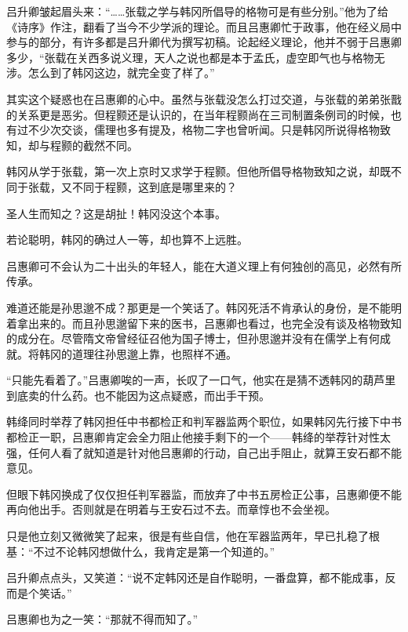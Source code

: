 吕升卿皱起眉头来：“……张载之学与韩冈所倡导的格物可是有些分别。”他为了给《诗序》作注，翻看了当今不少学派的理论。而且吕惠卿忙于政事，他在经义局中参与的部分，有许多都是吕升卿代为撰写初稿。论起经义理论，他并不弱于吕惠卿多少，“张载在关西多说义理，天人之说也都是本于孟氏，虚空即气也与格物无涉。怎么到了韩冈这边，就完全变了样了。”

其实这个疑惑也在吕惠卿的心中。虽然与张载没怎么打过交道，与张载的弟弟张戬的关系更是恶劣。但程颢还是认识的，在当年程颢尚在三司制置条例司的时候，也有过不少次交谈，儒理也多有提及，格物二字也曾听闻。只是韩冈所说得格物致知，却与程颢的截然不同。

韩冈从学于张载，第一次上京时又求学于程颢。但他所倡导格物致知之说，却既不同于张载，又不同于程颢，这到底是哪里来的？

圣人生而知之？这是胡扯！韩冈没这个本事。

若论聪明，韩冈的确过人一等，却也算不上远胜。

吕惠卿可不会认为二十出头的年轻人，能在大道义理上有何独创的高见，必然有所传承。

难道还能是孙思邈不成？那更是一个笑话了。韩冈死活不肯承认的身份，是不能明着拿出来的。而且孙思邈留下来的医书，吕惠卿也看过，也完全没有谈及格物致知的成分在。尽管隋文帝曾经征召他为国子博士，但孙思邈并没有在儒学上有何成就。将韩冈的道理往孙思邈上靠，也照样不通。

“只能先看着了。”吕惠卿唉的一声，长叹了一口气，他实在是猜不透韩冈的葫芦里到底卖的什么药。也不能因为这点疑惑，而出手干预。

韩绛同时举荐了韩冈担任中书都检正和判军器监两个职位，如果韩冈先行接下中书都检正一职，吕惠卿肯定会全力阻止他接手剩下的一个——韩绛的举荐针对性太强，任何人看了就知道是针对他吕惠卿的行动，自己出手阻止，就算王安石都不能意见。

但眼下韩冈换成了仅仅担任判军器监，而放弃了中书五房检正公事，吕惠卿便不能再向他出手。否则就是在明着与王安石过不去。而章惇也不会坐视。

只是他立刻又微微笑了起来，很是有些自信，他在军器监两年，早已扎稳了根基：“不过不论韩冈想做什么，我肯定是第一个知道的。”

吕升卿点点头，又笑道：“说不定韩冈还是自作聪明，一番盘算，都不能成事，反而是个笑话。”

吕惠卿也为之一笑：“那就不得而知了。”

